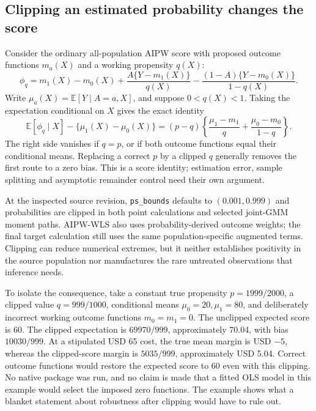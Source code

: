 \subsection{Clipping an estimated probability changes the score}
\label{exec20:pyfx-clipping}
Consider the ordinary all-population AIPW score with proposed outcome
functions $m_a(X)$ and a working propensity $q(X)$:
\begin{equation}
 \phi_q=m_1(X)-m_0(X)+\frac{A\{Y-m_1(X)\}}{q(X)}
       -\frac{(1-A)\{Y-m_0(X)\}}{1-q(X)}.
 \label{exec20:pyfx-score}
\end{equation}
Write $\mu_a(X)=\mathbb E[Y\mid A=a,X]$, and suppose $0<q(X)<1$.
Taking the expectation conditional on $X$ gives the exact identity
\begin{equation}
 \mathbb E[\phi_q\mid X]-\{\mu_1(X)-\mu_0(X)\}
 =(p-q)\left\{\frac{\mu_1-m_1}{q}
                 +\frac{\mu_0-m_0}{1-q}\right\}.
 \label{exec20:pyfx-bias}
\end{equation}
The right side vanishes if $q=p$, or if both outcome functions equal their
conditional means. Replacing a correct $p$ by a clipped $q$ generally removes
the first route to a zero bias. This is a score identity; estimation error,
sample splitting and asymptotic remainder control need their own argument.

At the inspected source revision, \texttt{ps\_bounds} defaults to
$(0.001,0.999)$ and probabilities are clipped in both point calculations
and selected joint-GMM moment paths. AIPW-WLS also uses probability-derived
outcome weights; the final target calculation still uses the same
population-specific augmented terms. Clipping can reduce numerical
extremes, but it neither establishes positivity in the source population
nor manufactures the rare untreated observations that inference needs.
\citep{exec20_python_effect_source}

To isolate the consequence, take a constant true propensity
$p=1999/2000$, a clipped value $q=999/1000$, conditional means
$\mu_0=20,\mu_1=80$, and deliberately incorrect working outcome functions
$m_0=m_1=0$. The unclipped expected score is 60. The clipped expectation
is $69970/999$, approximately 70.04, with bias $10030/999$.
At a stipulated USD 65 cost, the true mean margin is USD $-5$, whereas
the clipped-score margin is $5035/999$, approximately USD 5.04. Correct
outcome functions would restore the expected score to 60 even with this
clipping. No native package was run, and no claim is made that a fitted
OLS model in this example would select the imposed zero functions.
The example shows what a blanket statement about robustness after clipping
would have to rule out.~\citep{exec20_python_effect_reference}

